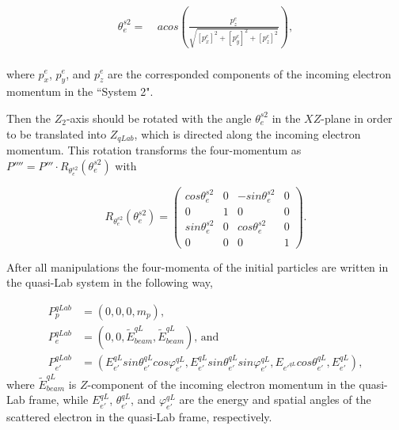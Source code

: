 \begin{enumerate}
\begin{equation}
\begin{aligned}\label{eq:ang_ei_sys2}
\theta_{e}^{s2} =&~acos\left (\frac{p_{z}^{e}}{\sqrt{[p_{x}^{e}]^{2}+[p_{y}^{e}]^{2}+[p_{z}^{e}]^{2}}}\right ),\\
\end{aligned}
\end{equation}

where $p_{x}^{e}$, $p_{y}^{e}$, and $p_{z}^{e}$ are the corresponded components of the incoming electron momentum in the ``System 2".

Then the $Z_{2}$-axis should be rotated with the angle $\theta_{e}^{s2}$ in the $XZ$-plane in order to be translated into $Z_{qLab}$, which is directed along the incoming electron momentum. This rotation transforms the four-momentum as $P'''' = P''' \cdot R_{\theta_{e}^{s2}}(\theta_{e}^{s2})$  with

\begin{equation}\label{eq:rot_th_s2}
R_{\theta_{e}^{s2}}(\theta_{e}^{s2})=\begin{pmatrix}
cos\theta_{e}^{s2} &0  &-sin\theta_{e}^{s2}  &0 \\ 
 0& 1 & 0 &0 \\ 
 sin\theta_{e}^{s2} &0  &cos\theta_{e}^{s2}  & 0\\ 
0 &0  & 0 &1 
\end{pmatrix}.
\end{equation}

\end{enumerate}

After all manipulations the four-momenta of the initial particles are written in the quasi-Lab system in the following way,


\begin{equation}
\begin{aligned}\label{eq:in_part_qlab}
P_{p}^{qLab} &= (0, 0, 0, m_{p}),\\[5pt]
P_{e}^{qLab} &= (0, 0, \widetilde{E}_{beam}^{qL}, \widetilde{E}_{beam}^{qL}) \textrm{,~and} \\[5pt]
P_{e'}^{qLab} &= (E_{e'}^{qL}sin \theta_{e'}^{qL}cos \varphi_{e'}^{qL},E_{e'}^{qL}sin \theta_{e'}^{qL}sin \varphi_{e'}^{qL},E_{e'^{qL}}cos \theta_{e'}^{qL},E_{e'}^{qL}),
\end{aligned}
\end{equation}
where $\widetilde{E}_{beam}^{qL}$ is $Z$-component of the incoming electron momentum in the quasi-Lab frame, while $E_{e'}^{qL}$, $\theta_{e'}^{qL}$, and $\varphi_{e'}^{qL}$ are the energy and spatial angles of the scattered electron in the quasi-Lab frame, respectively.


